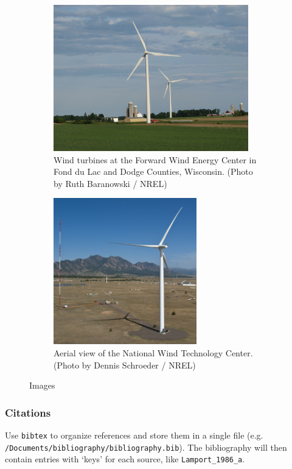 \begin{figure}
          \begin{subfigure}[b]{.55\linewidth}
            \centering
            \includegraphics[height=2.5in]{files/21206}
            \caption{Wind turbines at the Forward Wind Energy Center in Fond du Lac and Dodge Counties, Wisconsin. (Photo by Ruth Baranowski / NREL)}\label{fig:21206}
          \end{subfigure}%
          \begin{subfigure}[b]{.55\linewidth}
            \centering
            \includegraphics[height=2.5in]{files/20018}
            \caption{Aerial view of the National Wind Technology Center. (Photo by Dennis Schroeder / NREL)}\label{fig:20018}
          \end{subfigure}
          \caption{Images}\label{fig:NRELimages}
\end{figure}

\subsubsection{Citations}
\label{Sec:Bib}
Use \texttt{bibtex} to organize references and store them in a single file (e.g. \verb+/Documents/bibliography/bibliography.bib+). The bibliography will then contain entries with `keys' for each source, like \texttt{Lamport\_1986\_a}. 

